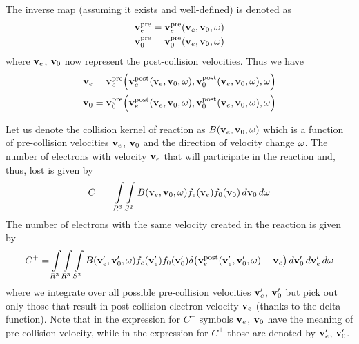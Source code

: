 \documentclass{article}
\begin{document}
The inverse map (assuming it exists and well-defined) is denoted as 
\begin{align*}
\vect{v}_e^\text{pre} &= \vect{v}_e^\text{pre} \of{\vect{v}_e, \vect{v}_0, \vect{\omega}}
\\
\vect{v}_0^\text{pre} &= \vect{v}_0^\text{pre} \of{\vect{v}_e, \vect{v}_0, \vect{\omega}}
\end{align*} 
where $\mathbf{v}_e$, $\mathbf{v}_0$ now represent the post-collision velocities. Thus we have 
\begin{align*}
\vect{v}_e &= \vect{v}_e^\text{pre} \of{\vect{v}_e^\text{post} \of{\vect{v}_e, \vect{v}_0, \vect{\omega}}, \vect{v}_0^\text{post} \of{\vect{v}_e, \vect{v}_0, \vect{\omega}}, \vect{\omega}}
\\
\vect{v}_0 &= \vect{v}_0^\text{pre} \of{\vect{v}_e^\text{post} \of{\vect{v}_e, \vect{v}_0, \vect{\omega}}, \vect{v}_0^\text{post} \of{\vect{v}_e, \vect{v}_0, \vect{\omega}}, \vect{\omega}}
\end{align*} 

Let us denote the collision kernel of reaction as $B\of{\vect{v}_e, \vect{v}_0, \vect{\omega}}$ which is a function of pre-collision velocities $\mathbf{v}_e$, $\mathbf{v}_0$ and the direction of velocity change $\mathbf{\omega}$. The number of electrons with velocity $\mathbf{v}_e$ that will participate in the reaction and, thus, lost is given by 
\begin{align*}
C^- = \myint_{R^3} \myint_{S^2} B\of{\vect{v}_e, \vect{v}_0, \vect{\omega}} f_e\of{\vect{v}_e} f_0\of{\vect{v}_0} \diff{\vect{v}_0} \diff{\vect{\omega}}
\end{align*}
The number of electrons with the same velocity created in the reaction is given by
\begin{align*}
C^+ = \myint_{R^3} \myint_{R^3} \myint_{S^2} 
B\of{\vect{v}_e^\prime, \vect{v}_0^\prime, \vect{\omega}} 
f_e\of{\vect{v}_e^\prime} f_0\of{\vect{v}_0^\prime} 
\delta\of{\vect{v}_e^\text{post}\of{\vect{v}_e^\prime, \vect{v}_0^\prime, \vect{\omega}} - \vect{v}_e} 
\diff{\vect{v}_0^\prime} \diff{\vect{v}_e^\prime} \diff{\vect{\omega}}
\end{align*}
where we integrate over all possible pre-collision velocities $\mathbf{v}_e^\prime$, $\mathbf{v}_0^\prime$ but pick out only those that result in post-collision electron velocity $\mathbf{v}_e$ (thanks to the delta function). Note that in the expression for $C^-$ symbols $\mathbf{v}_e$, $\mathbf{v}_0$ have the meaning of pre-collision velocity, while in the expression for $C^+$ those are denoted by $\mathbf{v}_e^\prime$, $\mathbf{v}_0^\prime$. 
\end{document}
